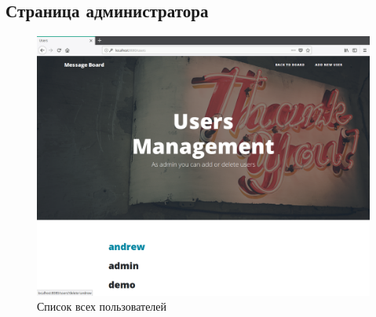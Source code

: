 \documentclass{article}
\begin{document}
	\subsection{Страница администратора}
    \begin{figure}[H]
        \begin{flushleft}
            \centerline{\includegraphics[scale=0.4]{admin.png}}
            \caption{Список всех пользователей}
        \end{flushleft}
    \end{figure}
\end{document}

